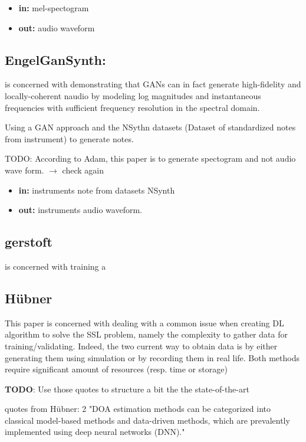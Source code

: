\documentclass{article}
\begin{document}
\begin{itemize}
    \item \textbf{in:} mel-spectogram 
    \item \textbf{out:} audio waveform
\end{itemize}

\subsection{EngelGanSynth:}

\cite{engel2019gansynth} is concerned with demonstrating that GANs can in fact generate high-fidelity and locally-coherent naudio by modeling log magnitudes and instantaneous frequencies with sufficient frequency resolution in the spectral domain.

Using a GAN approach and the NSythn datasets (Dataset of standardized notes from instrument) to generate notes. 

TODO: According to Adam, this paper is to generate spectogram and not audio wave form. $\rightarrow$ check again
\begin{itemize}
    \item \textbf{in:} instruments note from datasets NSynth 
    \item \textbf{out:} instruments audio waveform.
\end{itemize}

\subsection{gerstoft}

\cite{gerstoft2020parametric} is concerned with training a 


\subsection{Hübner}

This paper is concerned with dealing with a common issue when creating DL algorithm to solve the SSL problem, namely the complexity to gather data for training/validating. Indeed, the two current way to obtain data is by either generating them using simulation or by recording them in real life. Both methods require significant amount of resources (resp. time or storage)

\textbf{TODO}: Use those quotes to structure a bit the the state-of-the-art

quotes from Hübner:
2
"DOA estimation methods can be categorized into classical model-based methods and data-driven methods, which are prevalently implemented using deep neural networks (DNN)."
\end{document}
